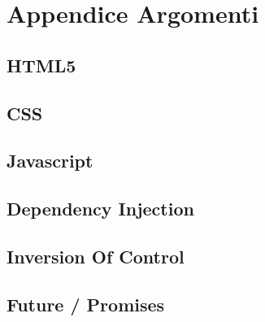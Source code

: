 \chapter{Appendice Argomenti} %

\label{Appendice} %
\section{HTML5}
\label{app:html5}
\section{CSS}
\label{app:css}
\section{Javascript}
\label{app:js}
\section{Dependency Injection}
\label{app:DepInj}
\section{Inversion Of Control}
\label{app:ioc}
\section{Future / Promises}
\label{app:future}